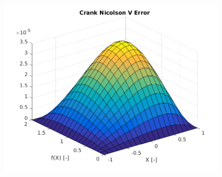\documentclass[12pt]{article}
\begin{document}
	\begin{figure}[!htb]
		\centering
		\includegraphics[scale=0.75]{CNv.png}
	\end{figure}


		
	
	
	
	
\end{document}
